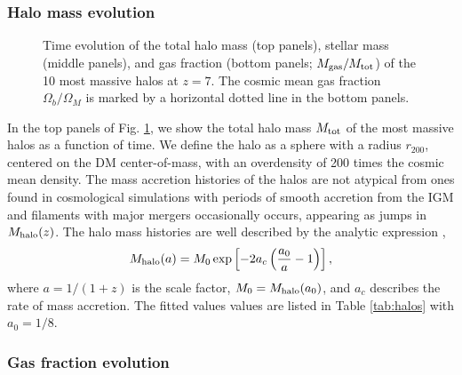 \documentclass[useAMS,usenatbib]{mn2e}
\begin{document}

\subsubsection{Halo mass evolution}

\begin{figure}
  \caption{\label{fig:massevo} Time evolution of the total halo mass
    (top panels), stellar mass (middle panels), and gas fraction
    (bottom panels; $M_{\rm gas} / M_{\rm tot}$) of the 10 most
    massive halos at $z=7$.  The cosmic mean gas fraction $\Omega_b /
    \Omega_M$ is marked by a horizontal dotted line in the bottom
    panels.}
\end{figure}

In the top panels of Fig. \ref{fig:massevo}, we show the total halo
mass $M_{\rm tot}$ of the most massive halos as a function of time.
We define the halo as a sphere with a radius $r_{200}$, centered on
the DM center-of-mass, with an overdensity of 200 times the cosmic
mean density.  The mass accretion histories of the halos are not
atypical from ones found in cosmological simulations with periods of
smooth accretion from the IGM and filaments with major mergers
occasionally occurs, appearing as jumps in $M_{\rm halo}(z)$.  The
halo mass histories are well described by the analytic expression
\citep{Wechsler02},
%
\begin{equation}
  \label{eqn:mhalo}
  M_{\rm halo}(a) = M_0 \exp \left[-2a_c\left(\frac{a_0}{a} -
    1\right)\right],
\end{equation}
%
where $a = 1/(1+z)$ is the scale factor, $M_0 = M_{\rm halo}(a_0)$,
and $a_c$ describes the rate of mass accretion.  The fitted values
values are listed in Table \ref{tab:halos} with $a_0 = 1/8$.

\subsubsection{Gas fraction evolution}
\end{document}

